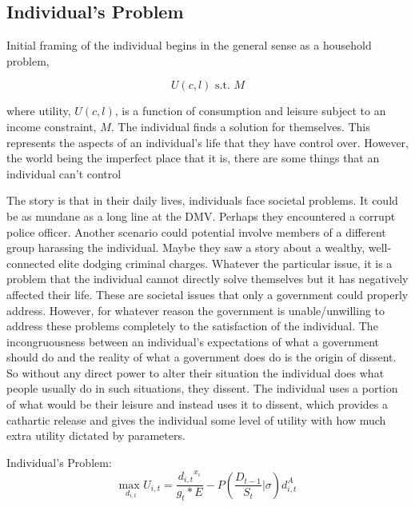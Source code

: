 \documentclass[12pt]{article}
\begin{document}
\begin{spacing}{1.5}
\subsection{Individual's Problem}
Initial framing of the individual begins in the general sense as a household problem, 

\begin{equation}
	U(c,l) \text{ s.t. } M
\end{equation}

\noindent where utility, $U(c,l)$, is a function of consumption and leisure subject to an income constraint, $M$. The individual finds a solution for themselves. This represents the aspects of an individual's life that they have control over. However, the world being the imperfect place that it is, there are some things that an individual can't control  

The story is that in their daily lives, individuals face societal problems. It could be as mundane as a long line at the DMV. Perhaps they encountered a corrupt police officer. Another scenario could potential involve members of a different group harassing the individual. Maybe they saw a story about a wealthy, well-connected elite dodging criminal charges. Whatever the particular issue, it is a problem that the individual cannot directly solve themselves but it has negatively affected their life. These are societal issues that only a government could properly address. However, for whatever reason the government is unable/unwilling to address these problems completely to the satisfaction of the individual. The incongruousness between an individual's expectations of what a government should do and the reality of what a government does do is the origin of dissent. So without any direct power to alter their situation the individual does what people usually do in such situations, they dissent. The individual uses a portion of what would be their leisure and instead uses it to dissent, which provides a cathartic release and gives the individual some level of utility with how much extra utility dictated by parameters. 

\vspace{.5 em}
\noindent Individual's Problem:
\begin{equation}
{\underset{d_{i,t}}{\text{max }}}  U_{i,t}= \frac{{d_{i,t}}^{{x}_i}}{g_t * E} - P \left(\frac{D_{t-1}}{S_t}\Bigg|\sigma \right)d_{i,t}^A
\end{equation}


\end{spacing}
\end{document}
